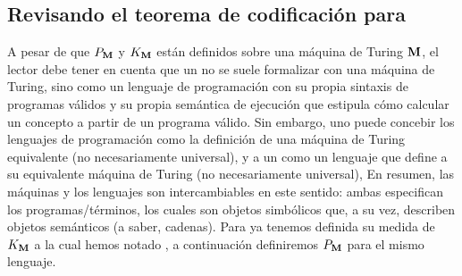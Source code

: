 \subsection{Revisando el teorema de codificación para \gramgeo}


A pesar de que $P_{{\bf M}}$ y $K_{{\bf M}}$ están definidos sobre una máquina de Turing ${\bf M}$, el lector debe tener en cuenta que un \lot no se suele formalizar con una máquina de Turing, sino como un lenguaje de programación con su propia sintaxis de programas válidos y su propia semántica de ejecución que estipula cómo calcular un concepto a partir de un programa válido. Sin embargo, uno puede concebir los lenguajes de programación como la definición de una máquina de Turing equivalente (no necesariamente universal), y a un \lot como un lenguaje que define a su equivalente máquina de Turing (no necesariamente universal), En resumen, las máquinas y los lenguajes son intercambiables en este  sentido: ambas especifican los programas/términos, los cuales son objetos simbólicos que, a su vez, describen objetos semánticos (a saber, cadenas). Para \gramgeo ya tenemos definida su medida de $K_{{\bf M}}$ a la cual hemos notado \mdlgeo, a continuación definiremos $P_{{\bf M}}$ para el mismo lenguaje.




